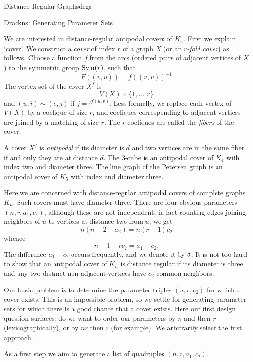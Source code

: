 \begin{chap}{Distance-Regular Graphs}{drgs}
\begin{sect}{Drackns: Generating Parameter Sets}
\begin{para}
We are interested in distance-regular antipodal covers of $K_n$.
First we explain `cover'. We construct a \textsl{cover} of
index $r$ of a graph $X$ (or an \textsl{$r$-fold cover})
as follows. Choose a function $f$ from the arcs (ordered pairs of adjacent
vertices of $X$) to the symmetric group $\operatorname{Sym}(r)$, such that
\[
    F((v,u)) =f((u,v))^{-1}
\]
The vertex set of the cover $X^f$ is 
\[
    V(X)\times \{1,\ldots,r\}
\]
and $(u,i)\sim (v,j)$ if $j = i^{f(u,v)}$. Less formally, we replace each
vertex of $V(X)$ by a coclique of size $r$, and cocliques corresponding
to adjacent vertices are joined by a matching of size $r$. The $r$-cocliques
are called the \textsl{fibers} of the cover.
\end{para}
%
\begin{para}
A cover $X^f$ is \textsl{antipodal} if its diameter is $d$ and two vertices
are in the same fiber if and only they are at distance $d$. The 3-cube is an antipodal
cover of $K_4$ with index two and diameter three. The line graph of the Petersen
graph is an antipodal cover of $K_5$ with index and diameter three.
\end{para}
%
\begin{para}
Here we are concerned with distance-regular antipodal covers of complete graphs $K_n$.
Such covers must have diameter three. There are four obvious parameters $(n,r,a_1,c_2)$,
although these are not independent, in fact counting edges joining neighbors
of $u$ to vertices at distance two from $u$, we get
\[
    n(n-2-a_2) = n(r-1)c_2
\]
whence
\begin{equation}
\label{eq:n1rc2}
    n-1-rc_2 = a_1-c_2.
\end{equation}
The difference $a_1-c_2$ occurs frequently, and we denote it by $\delta$.
It is not too hard to show that an antipodal
cover of $K_n$ is distance regular if its diameter is three and any two 
distinct non-adjacent vertices have $c_2$ common neighbors.
\end{para}
%
\begin{para}
Our basic problem is to determine the parameter triples $(n,r,c_2)$
for which a cover exists. This is an impossible problem, so we settle
for generating parameter sets for which there is a good chance that a
cover exists. Here our first design question surfaces: do we want to order
our parameters by $n$ and then $r$ (lexicographically), or by $nr$ then $r$
(for example). We arbitrarily select the first approach.
\end{para}
%
\begin{para}
As a first step we aim to generate a list of quadruples $(n,r,a_1,c_2)$.

\end{para}
\end{sect}
\end{chap}
